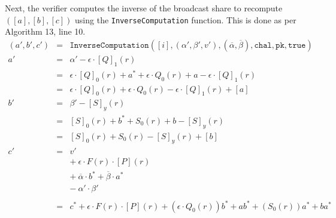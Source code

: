 \documentclass[twoside,11pt,openright]{report}
\begin{document}
Next, the verifier computes the inverse of the broadcast share to recompute $([a], [b], [c])$ using the \texttt{InverseComputation} function. This is done as per Algorithm 13, line 10.
\begin{align*}
  (a', b', c') & = & \texttt{InverseComputation}([i], (\alpha', \beta', v'), (\overline{\alpha}, \overline{\beta}), \texttt{chal}, \texttt{pk}, \texttt{true})         \\
  a'           & = & \alpha' - \epsilon \cdot {[Q]}_1(r)                                                                                                               \\
               & = & \epsilon \cdot {[Q]}_0(r) + a^* + \epsilon \cdot Q_0(r) + a - \epsilon \cdot {[Q]}_1(r)                                                           \\
               & = & \epsilon \cdot {[Q]}_0(r) + \epsilon \cdot Q_0(r) - \epsilon \cdot {[Q]}_1(r)   + [a]                                                             \\
  b'           & = & \beta' - {[S]}_y(r)                                                                                                                               \\
               & = & {[S]}_0(r) + b^* + S_0(r)  + b - {[S]}_y(r)                                                                                                       \\
               & = & {[S]}_0(r) + S_0(r) - {[S]}_y(r) + [b]                                                                                                            \\
  c'           & = & v'                                                                                                                                                \\
               &   & +\ \epsilon \cdot F(r) \cdot [P](r)                                                                                                               \\
               &   & +\ \overline{\alpha} \cdot b^* + \overline{\beta} \cdot a^*                                                                                       \\
               &   & -\ \alpha' \cdot \beta'                                                                                                                           \\\\
               & = & c^* + \epsilon \cdot F(r) \cdot [P](r) + (\epsilon \cdot Q_0(r))b^* + ab^* + (S_0(r))a^* + ba^*                                                   \\

\end{align*}
\end{document}
